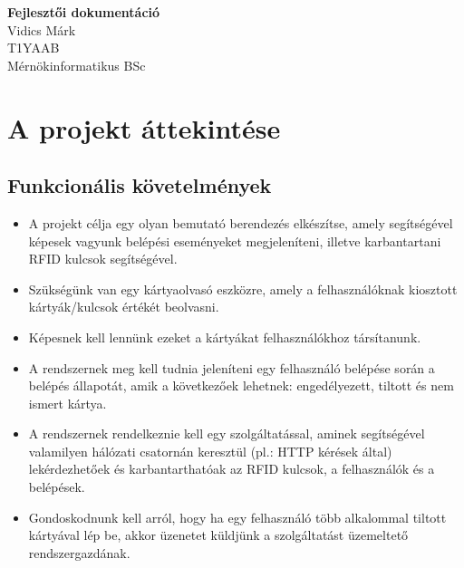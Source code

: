 \documentclass[11pt, a4paper]{article}
\begin{document}
	
	\begin{titlepage}
		\vspace*{\fill}
		\begin{center}
			\Huge \textbf{Fejlesztői dokumentáció} \\
			Vidics Márk \\
			T1YAAB \\
			Mérnökinformatikus BSc
		\end{center}
		\vspace*{\fill}
	\end{titlepage}
	
	\tableofcontents
	\listoftables
	
	\section{A projekt áttekintése}
		\subsection{Funkcionális követelmények}
			\begin{itemize}
			\justifying
				\item A projekt célja egy olyan bemutató berendezés elkészítse, amely segítségével képesek vagyunk belépési eseményeket megjeleníteni, illetve karbantartani RFID kulcsok segítségével.
				
				\item Szükségünk van egy kártyaolvasó eszközre, amely a felhasználóknak kiosztott kártyák/kulcsok értékét beolvasni.
				
				\item Képesnek kell lennünk ezeket a kártyákat felhasználókhoz társítanunk.
				
				\item A rendszernek meg kell tudnia jeleníteni egy felhasználó belépése során a belépés állapotát, amik a következőek lehetnek: engedélyezett, tiltott és nem ismert kártya.
				
				\item A rendszernek rendelkeznie kell egy szolgáltatással, aminek segítségével valamilyen hálózati csatornán keresztül (pl.: HTTP kérések által) lekérdezhetőek és karbantarthatóak az RFID kulcsok, a felhasználók és a belépések.
				
				\item Gondoskodnunk kell arról, hogy ha egy felhasználó több alkalommal tiltott kártyával lép be, akkor üzenetet küldjünk a szolgáltatást üzemeltető rendszergazdának.
			\end{itemize}
		\vfill
\end{document}
